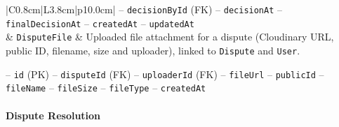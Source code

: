 \begin{center}
\begin{longtable}{|C{0.8cm}|L{3.8cm}|p{10.0cm}|}
\hspace*{1em}-- \texttt{decision\allowbreak By\allowbreak Id} (FK) \newline
\hspace*{1em}-- \texttt{decision\allowbreak At} \newline
\hspace*{1em}-- \texttt{final\allowbreak Decision\allowbreak At} \newline
\hspace*{1em}-- \texttt{created\allowbreak At} \newline
\hspace*{1em}-- \texttt{updated\allowbreak At} \\
\hline
\hline
{} & \texttt{Dispute\allowbreak File} & Uploaded file attachment for a dispute (Cloudinary URL, public ID, filename, size and uploader), linked to \texttt{Dispute} and \texttt{User}.\par\smallskip
\hspace*{1em}-- \texttt{id} (PK) \newline
\hspace*{1em}-- \texttt{dispute\allowbreak Id} (FK) \newline
\hspace*{1em}-- \texttt{uploader\allowbreak Id} (FK) \newline
\hspace*{1em}-- \texttt{file\allowbreak Url} \newline
\hspace*{1em}-- \texttt{public\allowbreak Id} \newline
\hspace*{1em}-- \texttt{file\allowbreak Name} \newline
\hspace*{1em}-- \texttt{file\allowbreak Size} \newline
\hspace*{1em}-- \texttt{file\allowbreak Type} \newline
\hspace*{1em}-- \texttt{created\allowbreak At} \\
\end{longtable}\addtocounter{table}{-1}
\end{center}

\paragraph{Dispute Resolution}

